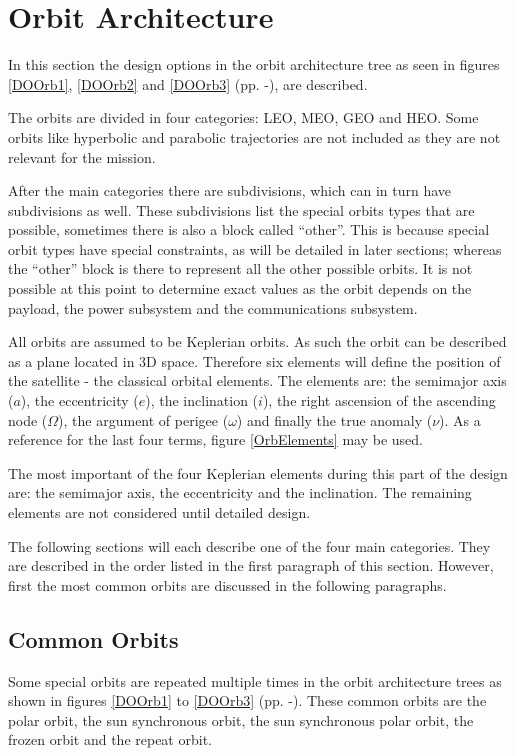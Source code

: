 \section{Orbit Architecture}
\label{designOptionsOrbit}
In this section the design options in the orbit architecture tree as seen in figures \ref{DOOrb1}, \ref{DOOrb2} and \ref{DOOrb3} (pp. \pageref{DOOrb1}-\pageref{DOOrb1}), are described. 

The orbits are divided in four categories: \ac{LEO}, \ac{MEO}, \ac{GEO} and \ac{HEO}. Some orbits like hyperbolic and parabolic trajectories are not included as they are not relevant for the mission.

After the main categories there are subdivisions, which can in turn have subdivisions as well. These subdivisions list the special orbits types that are possible, sometimes there is also a block called ``other''. This is because special orbit types have special constraints, as will be detailed in later sections; whereas the ``other'' block is there to represent all the other possible orbits. It is not possible at this point to determine exact values as the orbit depends on the payload, the power subsystem and the communications subsystem.

All orbits are assumed to be Keplerian orbits. As such the orbit can be described as a plane located in 3D space. Therefore six elements will define the position of the satellite - the classical orbital elements. The elements are: the semimajor axis ($a$), the eccentricity ($e$), the inclination ($i$), the right ascension of the ascending node ($\Omega$), the argument of perigee ($\omega$) and finally the true anomaly ($\nu$). As a reference for the last four terms, figure \ref{OrbElements} may be used.

The most important of the four Keplerian elements during this part of the design are: the semimajor axis, the eccentricity and the inclination. The remaining elements are not considered until detailed design.

The following sections will each describe one of the four main categories. They are described in the order listed in the first paragraph of this section. However, first the most common orbits are discussed in the following paragraphs.

\subsection {Common Orbits}
\label{sec:blOrbCommon}
Some special orbits are repeated multiple times in the orbit architecture trees as shown in figures \ref{DOOrb1} to \ref{DOOrb3} (pp. \pageref{DOOrb1}-\pageref{DOOrb1}). These common orbits are the polar orbit, the sun synchronous orbit, the sun synchronous polar orbit, the frozen orbit and the repeat orbit.

